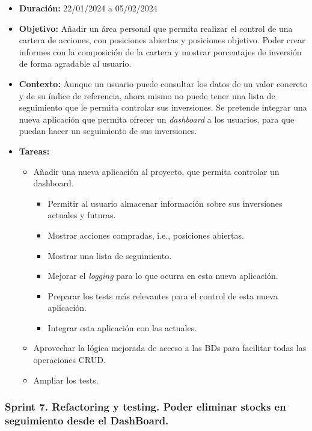 \begin{itemize}
\item  
\textbf{Duración:} 22/01/2024 a 05/02/2024

\item
\textbf{Objetivo:} Añadir un área personal que permita realizar el control de una cartera de acciones, con posiciones abiertas y posiciones objetivo. Poder crear informes con la composición de la cartera y mostrar porcentajes de inversión de forma agradable al usuario.   

\item
\textbf{Contexto:} Aunque un usuario puede consultar los datos de un valor concreto y de su índice de referencia, ahora mismo no puede tener una lista de seguimiento que le permita controlar sus inversiones. Se pretende integrar una nueva aplicación que permita ofrecer un \emph{dashboard} a los usuarios, para que puedan hacer un seguimiento de sus inversiones. 

\item
\textbf{Tareas:}
	\begin{itemize}
	\tightlist
	\item 
	Añadir una nueva aplicación al proyecto, que permita controlar un dashboard. 
		\begin{itemize}
		\tightlist
		\item
		Permitir al usuario almacenar información sobre sus inversiones actuales y futuras. 
		\item
		Mostrar acciones compradas, i.e., posiciones abiertas.
		\item
		Mostrar una lista de seguimiento. 
		\item
		Mejorar el \emph{logging} para lo que ocurra en esta nueva aplicación.
		\item
		Preparar los tests más relevantes para el control de esta nueva aplicación. 
		\item
		Integrar esta aplicación con las actuales. 
		\end{itemize}
	\item
	Aprovechar la lógica mejorada de acceso a las BDs para facilitar todas las operaciones CRUD. 
	\item 	
	Ampliar los tests.
  	\end{itemize}
\end{itemize}


\subsubsection{Sprint 7. Refactoring y testing. Poder eliminar stocks en seguimiento desde el DashBoard.}

